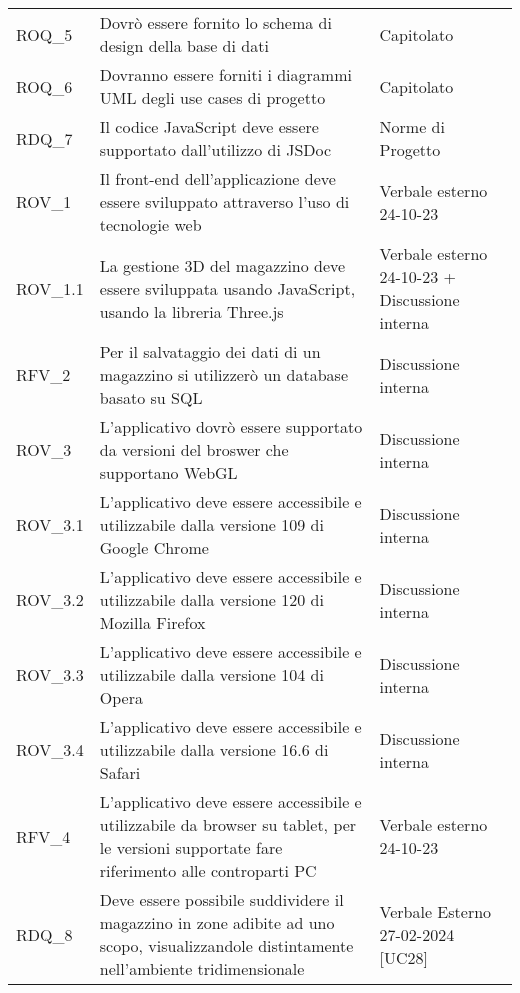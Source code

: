 \begin{xltabular}{\textwidth}{ p{0.2\textwidth} | X | p{0.2\textwidth} }
    ROQ\_5& Dovrò essere fornito lo schema di design della base di dati & Capitolato  \\
    ROQ\_6& Dovranno essere forniti i diagrammi UML degli use cases di progetto & Capitolato  \\
    RDQ\_7& Il codice JavaScript deve essere supportato dall'utilizzo di JSDoc & Norme di Progetto \\
    ROV\_1& Il front-end dell'applicazione deve essere sviluppato attraverso l'uso di tecnologie web & Verbale esterno 24-10-23 \\
    ROV\_1.1& La gestione 3D del magazzino deve essere sviluppata usando JavaScript, usando la libreria Three.js & Verbale esterno 24-10-23 + Discussione interna \\
    RFV\_2& Per il salvataggio dei dati di un magazzino si utilizzerò un database basato su SQL & Discussione interna\\
    ROV\_3& L'applicativo dovrò essere supportato da versioni del broswer che supportano WebGL & Discussione interna\\
    ROV\_3.1& L'applicativo deve essere accessibile e utilizzabile dalla versione 109 di Google Chrome & Discussione interna\\
    ROV\_3.2& L'applicativo deve essere accessibile e utilizzabile dalla versione 120 di Mozilla Firefox & Discussione interna\\
    ROV\_3.3& L'applicativo deve essere accessibile e utilizzabile dalla versione 104 di Opera & Discussione interna\\
    ROV\_3.4& L'applicativo deve essere accessibile e utilizzabile dalla versione 16.6 di Safari & Discussione interna\\
    RFV\_4& L'applicativo deve essere accessibile e utilizzabile da browser su tablet, per le versioni supportate fare riferimento alle controparti PC & Verbale esterno 24-10-23\\
    RDQ\_8 & Deve essere possibile suddividere il magazzino in zone adibite ad uno scopo, visualizzandole distintamente nell'ambiente tridimensionale & Verbale Esterno 27-02-2024 [UC28] \\
    \hline

    \hline
\end{xltabular}


\renewcommand{\arraystretch}{1.25}
